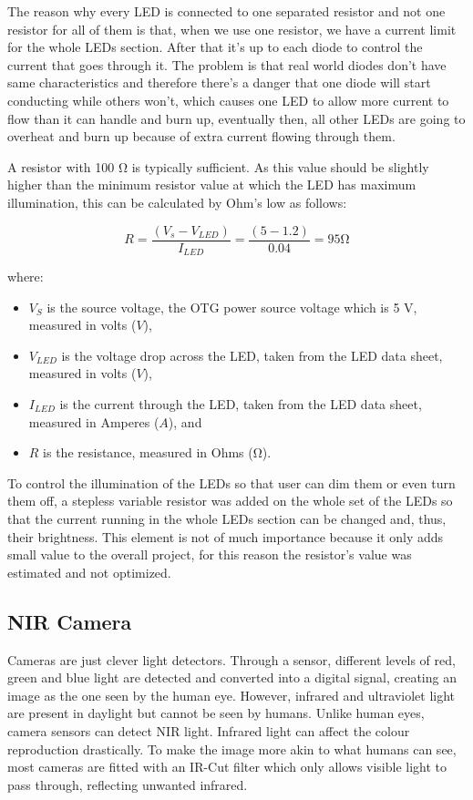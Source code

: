 The reason why every LED is connected to one separated resistor and not one resistor for all of them is that, when we use one resistor, we have a current limit for the whole LEDs section. After that it's up to each diode to control the current that goes through it. The problem is that real world diodes don't have same characteristics and therefore there's a danger that one diode will start conducting while others won't, which causes one LED to allow more current to flow than it can handle and burn up, eventually then, all other LEDs are going to overheat and burn up because of extra current flowing through them.

A resistor with 100 \si{\ohm} is typically sufficient. As this value should be slightly higher than the minimum resistor value at which the LED has maximum illumination, this can be calculated by Ohm’s low as follows:


\begin{equation}
R= \frac {(V_s - V_{LED})}{I_{LED}} =  \frac {(5-1.2)}{0.04}=95   \si{\ohm}
\end{equation}


where:
\begin{itemize}
  \item $V_S$ is the source voltage, the OTG power source voltage which is 5 V, measured in volts ($V$),
  \item $V_{LED}$ is the voltage drop across the LED, taken from the LED data sheet, measured in volts ($V$),
  \item $I_{LED}$ is the current through the LED, taken from the LED data sheet, measured in Amperes ($A$), and
  \item $R$ is the resistance, measured in Ohms (\si{\ohm}).
\end{itemize}


To control the illumination of the LEDs so that user can dim them or even turn them off, a stepless variable resistor was added on the whole set of the LEDs so that the current running in the whole LEDs section can be changed and, thus, their brightness. This element is not of much importance because it only adds small value to the overall project, for this reason the resistor's value was estimated and not optimized.


\subsection{NIR Camera}

Cameras are just clever light detectors. Through a sensor, different levels of red, green and blue light are detected and converted into a digital signal, creating an image as the one seen by the human eye. However, infrared and ultraviolet light are present in daylight but cannot be seen by humans. Unlike human eyes, camera sensors can detect NIR light. Infrared light can affect the colour reproduction drastically. To make the image more akin to what humans can see, most cameras are fitted with an IR-Cut filter which only allows visible light to pass through, reflecting unwanted infrared. 

